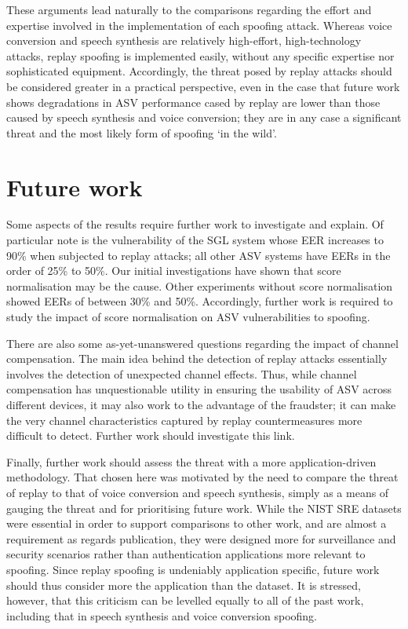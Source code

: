 These arguments lead naturally to the comparisons regarding the effort and expertise involved in the implementation of each spoofing attack.  Whereas voice conversion and speech synthesis are relatively high-effort, high-technology attacks, replay spoofing is implemented easily, without any specific expertise nor sophisticated equipment.  Accordingly, the threat posed by replay attacks should be considered greater in a practical perspective, even in the case that future work shows degradations in ASV performance cased by replay are lower than those caused by speech synthesis and voice conversion; they are in any case a significant threat and the most likely form of spoofing `in the wild'.



\section{Future work}
\label{sec::future}

Some aspects of the results require further work to investigate and explain.  Of particular note is the vulnerability of the SGL system whose EER increases to 90\% when subjected to replay attacks; all other ASV systems have EERs in the order of 25\% to 50\%.  Our initial investigations have shown that score normalisation may be the cause.  Other experiments without score normalisation showed EERs of between 30\% and 50\%.  Accordingly, further work is required to study the impact of score normalisation on ASV vulnerabilities to spoofing. 

There are also some as-yet-unanswered questions regarding the impact of channel compensation.  The main idea behind the detection of replay attacks essentially involves the detection of unexpected channel effects.  Thus, while channel compensation has unquestionable utility in ensuring the usability of ASV across different devices, it may also work to the advantage of the fraudster; it can make the very channel characteristics captured by replay countermeasures more difficult to detect.  %
Further work should investigate this link.

Finally, further work should assess the threat with a more application-driven methodology.  That chosen here was motivated by the need to compare the threat of replay to that of voice conversion and speech synthesis, simply as a means of gauging the threat and for prioritising future work.  While the NIST SRE datasets were essential in order to support comparisons to other work, and are almost a requirement as regards publication, they were designed more for surveillance and security scenarios rather than authentication applications more relevant to spoofing.  Since replay spoofing is undeniably application specific, future work should thus consider more the application than the dataset.  It is stressed, however, that this criticism can be levelled equally to all of the past work, including that in speech synthesis and voice conversion spoofing.
